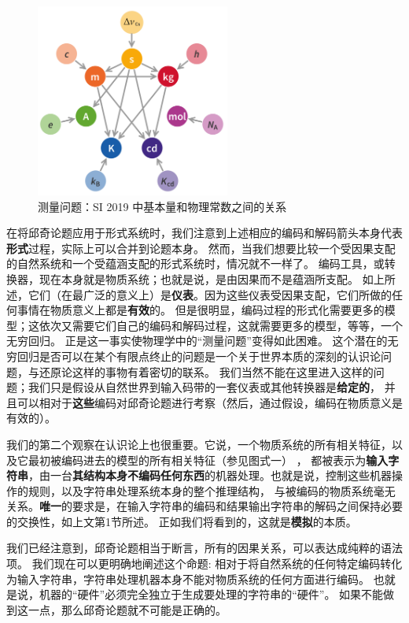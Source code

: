 \documentclass[a4paper,12pt]{article}
\begin{document}
\begin{figure}[ht]
\centering
\includegraphics[height=2.5in]{images/unit_relations_SI.png}
\caption{测量问题：SI 2019 中基本量和物理常数之间的关系}
\end{figure}

在将\gls{邱奇论题}应用于\gls{形式系统}时，我们注意到上述相应的\gls{编码}和\gls{解码}箭头本身代表\textbf{形式}过程，实际上可以合并到论题本身。
然而，当我们想要比较一个受\gls{因果}支配的自然系统和一个受\gls{蕴涵}支配的\gls{形式系统}时，情况就不一样了。
\gls{编码工具}，或\gls{转换器}，现在本身就是\gls{物质系统}；也就是说，是由\gls{因果}而不是\gls{蕴涵}所支配。
如上所述，它们（在最广泛的意义上）是\textbf{仪表}。因为这些仪表受\gls{因果}支配，它们所做的任何事情在\gls{物质}意义上都是\textbf{有效}的。
但是很明显，\gls{编码过程}的\gls{形式化}需要更多的\gls{模型}；这依次又需要它们自己的\gls{编码}和\gls{解码过程}，这就需要更多的\gls{模型}，等等，一个无穷回归。
正是这一事实使物理学中的“\gls{测量问题}”变得如此困难。
这个潜在的无穷回归是否可以在某个有限点终止的问题是一个关于世界本质的深刻的认识论问题，与还原论这样的事物有着密切的联系。
我们当然不能在这里进入这样的问题；我们只是假设从自然世界到输入码带的一套仪表或其他\gls{转换器}是\textbf{给定的}，
并且可以相对于\textbf{这些}\gls{编码}对\gls{邱奇论题}进行考察（然后，通过假设，\gls{编码}在\gls{物质}意义是有效的）。

我们的第二个观察在认识论上也很重要。它说，一个\gls{物质系统}的所有相关特征，以及它最初被\gls{编码}进去的\gls{模型}的所有相关特征（参见图式一） ，
都被表示为\textbf{输入字符串}，由一台\textbf{其结构本身不\gls{编码}任何东西}的机器处理。也就是说，控制这些机器操作的规则，以及\gls{字符串处理}系统本身的整个\gls{推理结构}，
与被\gls{编码}的\gls{物质系统}毫无关系。\textbf{唯一}的要求是，在输入字符串的\gls{编码}和结果输出字符串的\gls{解码}之间保持必要的交换性，如上文第1节所述。
正如我们将看到的，这就是\textbf{\gls{模拟}}的本质。

我们已经注意到，\gls{邱奇论题}相当于断言，所有的\gls{因果关系}，可以表达成纯粹的\gls{语法项}。
我们现在可以更明确地阐述这个\gls{命题}: 相对于将自然系统的任何特定\gls{编码}转化为输入字符串，\gls{字符串处理}机器本身不能对\gls{物质系统}的任何方面进行\gls{编码}。
也就是说，机器的“\gls{硬件}”必须完全独立于\gls{生成}要处理的字符串的“\gls{硬件}”。 如果不能做到这一点，那么\gls{邱奇论题}就不可能是正确的。
\end{document}
